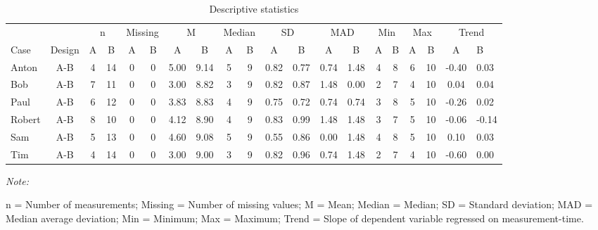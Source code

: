 \documentclass[
]{book}
\begin{document}
\begin{table}[!h]

\caption{\label{tab:unnamed-chunk-75}Descriptive statistics}
\begin{threeparttable}
\begin{tabular}[t]{lccccccccccccccccccl}
\toprule
\multicolumn{2}{c}{ } & \multicolumn{2}{c}{n} & \multicolumn{2}{c}{Missing} & \multicolumn{2}{c}{M} & \multicolumn{2}{c}{Median} & \multicolumn{2}{c}{SD} & \multicolumn{2}{c}{MAD} & \multicolumn{2}{c}{Min} & \multicolumn{2}{c}{Max} & \multicolumn{2}{c}{Trend} \\
\cmidrule(l{3pt}r{3pt}){3-4} \cmidrule(l{3pt}r{3pt}){5-6} \cmidrule(l{3pt}r{3pt}){7-8} \cmidrule(l{3pt}r{3pt}){9-10} \cmidrule(l{3pt}r{3pt}){11-12} \cmidrule(l{3pt}r{3pt}){13-14} \cmidrule(l{3pt}r{3pt}){15-16} \cmidrule(l{3pt}r{3pt}){17-18} \cmidrule(l{3pt}r{3pt}){19-20}
Case & Design & A & B & A & B & A & B & A & B & A & B & A & B & A & B & A & B & A & B\\
\midrule
Anton & A-B & 4 & 14 & 0 & 0 & 5.00 & 9.14 & 5 & 9 & 0.82 & 0.77 & 0.74 & 1.48 & 4 & 8 & 6 & 10 & -0.40 & 0.03\\
Bob & A-B & 7 & 11 & 0 & 0 & 3.00 & 8.82 & 3 & 9 & 0.82 & 0.87 & 1.48 & 0.00 & 2 & 7 & 4 & 10 & 0.04 & 0.04\\
Paul & A-B & 6 & 12 & 0 & 0 & 3.83 & 8.83 & 4 & 9 & 0.75 & 0.72 & 0.74 & 0.74 & 3 & 8 & 5 & 10 & -0.26 & 0.02\\
Robert & A-B & 8 & 10 & 0 & 0 & 4.12 & 8.90 & 4 & 9 & 0.83 & 0.99 & 1.48 & 1.48 & 3 & 7 & 5 & 10 & -0.06 & -0.14\\
Sam & A-B & 5 & 13 & 0 & 0 & 4.60 & 9.08 & 5 & 9 & 0.55 & 0.86 & 0.00 & 1.48 & 4 & 8 & 5 & 10 & 0.10 & 0.03\\
Tim & A-B & 4 & 14 & 0 & 0 & 3.00 & 9.00 & 3 & 9 & 0.82 & 0.96 & 0.74 & 1.48 & 2 & 7 & 4 & 10 & -0.60 & 0.00\\
\bottomrule
\end{tabular}
\begin{tablenotes}
\item \textit{Note: } 
\item n = Number of measurements; Missing = Number of missing values; M = Mean; Median = Median; SD = Standard deviation; MAD = Median average deviation; Min = Minimum; Max = Maximum; Trend = Slope of dependent variable regressed on measurement-time.
\end{tablenotes}
\end{threeparttable}
\end{table}
\end{document}
